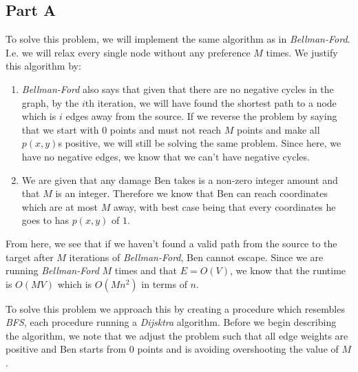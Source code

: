 \documentclass[12pt,twoside]{article}
\begin{document}

\begin{problems}

\section*{Part A}

\problem %
To solve this problem, we will implement the same algorithm as in \emph{Bellman-Ford}. I.e. we will relax every single node without any preference $M$ times. We justify this algorithm by:
\begin{enumerate}
\item \emph{Bellman-Ford} also says that given that there are no negative cycles in the graph, by the $i$th iteration, we will have found the shortest path to a node which is $i$ edges away from the source. If we reverse the problem by saying that we start with $0$ points and must not reach $M$ points and make all $p(x, y)$s positive, we will still be solving the same problem. Since here, we have no negative edges, we know that we can't have negative cycles.
\item We are given that any damage Ben takes is a non-zero integer amount and that $M$ is an integer. Therefore we know that Ben can reach coordinates which are at most $M$ away, with best case being that every coordinates he goes to has $p(x, y)$ of $1$.
\end{enumerate}
From here, we see that if we haven't found a valid path from the source to the target after $M$ iterations of \emph{Bellman-Ford}, Ben cannot escape. Since we are running \emph{Bellman-Ford} $M$ times and that $E=O(V)$, we know that the runtime is $O(MV)$ which is $O(Mn^2)$ in terms of $n$.


\problem %
To solve this problem we approach this by creating a procedure which resembles \emph{BFS}, each procedure running a \emph{Dijsktra} algorithm. Before we begin describing the algorithm, we note that we adjust the problem such that all edge weights are positive and Ben starts from $0$ points and is avoiding overshooting the value of $M$.\\


\end{problems}
\end{document}
